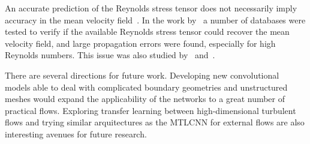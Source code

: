 \documentclass[11pt]{article}
\numberwithin{equation}{section}
\theoremstyle{plain}
\theoremstyle{definition}
\begin{document}
An accurate prediction of the Reynolds stress tensor does not necessarily imply accuracy in the mean velocity field~\cite{duraisamy}. In the work by~\cite{thompson_errors_dns} a number of databases were tested to verify if the available Reynolds stress tensor could recover the mean velocity field, and large propagation errors were found, especially for high Reynolds numbers. This issue was also studied by~\cite{wu_ill_conditioned} and~\cite{brener_cruz_thompson_anjos_2021}.

There are several directions for future work. Developing new convolutional models able to deal with complicated boundary geometries and unstructured meshes would expand the applicability of the networks to a great number of practical flows. Exploring transfer learning between high-dimensional turbulent flows and trying similar arquitectures as the MTLCNN for external flows are also interesting avenues for future research. 



\newpage


\end{document}
